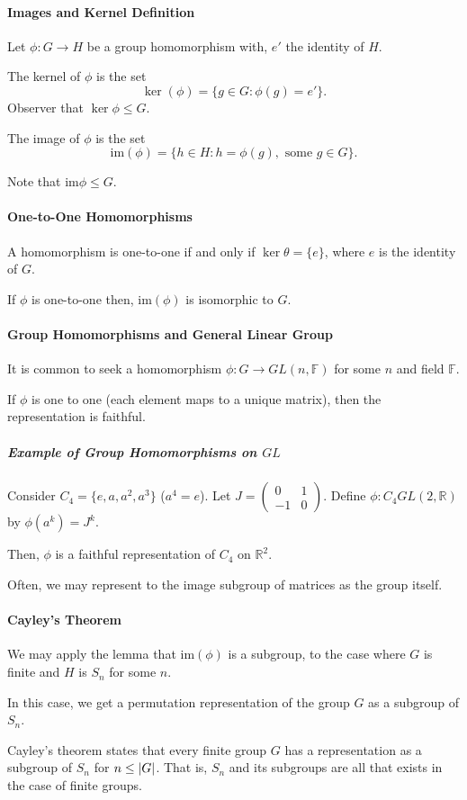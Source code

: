 \paragraph{Images and Kernel Definition}
Let \(\phi: G\to H\) be a group homomorphism with, \(e'\) the identity
of \(H\).

The kernel of \(\phi\) is the set
\[
    \ker(\phi) = \{
        g\in G : \phi(g) = e'
    \}.
\]
Observer that \(\ker \phi \leq G\).

The image of \(\phi\) is the set \[
    \mathrm{im} (\phi) = \{
        h\in H : h = \phi(g), \text{ some } g\in G
    \}.
\]

Note that \(\mathrm{im}\phi \leq G\).

\paragraph{One-to-One Homomorphisms}
A homomorphism is one-to-one if and only if \(\ker \theta = \{e\}\),
where \(e\) is the identity of \(G\).

If \(\phi\) is one-to-one then, \(\textrm{im}(\phi)\) is isomorphic to
\(G\).

\paragraph{Group Homomorphisms and General Linear Group}
It is common to seek a homomorphism
\(\phi: G \to GL(n, \mathbb{F})\) for some \(n\) and field \(\mathbb{F}\).

If \(\phi\) is one to one (each element maps to a unique matrix), then
the representation is faithful.

\subparagraph{Example of Group Homomorphisms on \(GL\)}
Consider \(C_4 = \{e, a, a^2, a^3\}\) (\(a^4 = e\)).
Let \(J = \begin{pmatrix}
        0  & 1 \\
        -1 & 0
    \end{pmatrix}.
\)
Define \(\phi: C_4 GL(2, \mathbb{R})\) by
\(\phi(a^k) = J^k\).

Then, \(\phi\) is a faithful representation of \(C_4\) on \(\mathbb{R}^2\).

Often, we may represent to the image subgroup of matrices as the group
itself.

\paragraph{Cayley's Theorem}
We may apply the lemma that \(\textrm{im}(\phi)\) is a subgroup, to the
case where \(G\) is finite and \(H\) is \(S_n\) for some \(n\).

In this case, we get a permutation representation of the group \(G\)
as a subgroup of \(S_n\).

Cayley's theorem states that every finite group \(G\) has a representation
as a subgroup of \(S_n\) for \(n \leq \abs{G}\).
That is, \(S_n\) and its subgroups are all that exists in the case of
finite groups.

